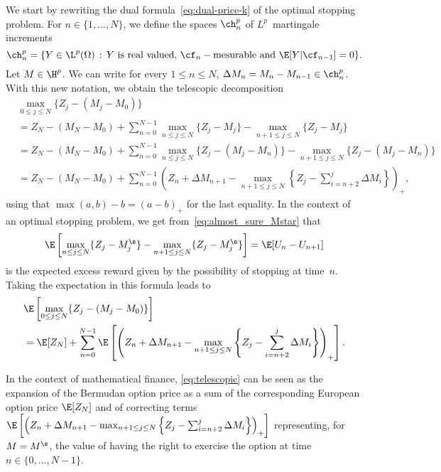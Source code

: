  
 We start by rewriting the dual formula~\eqref{eq:dual-price-k} of the optimal stopping problem. 
For $n \in \{1,\dots,N\}$, we define the spaces $\ch^p_n$ of $L^p$~martingale increments
\[
  \ch^p_n = \{ Y \in \L^p(\Omega) \,:\, Y \text{ is real valued, }\cf_{n}-\text{mesurable and } \E[Y | \cf_{n-1}] = 0\}.
\]
Let $M \in \H^p$. We can write  for every $1 \le n \le N$, $\Delta M_n=M_{n}-M_{n-1} \in \ch^p_n$. With this new notation, we obtain the telescopic decomposition
\begin{align*}
  &  \max_{0 \le j \le N} \{Z_{j} - (M_{j} -M_0)\}  \\
  & = Z_N-(M_N-M_0) + \sum_{n=0}^{N-1} \max_{n \le j \le N} \{Z_{j} - M_{j}\}  -  \max_{n + 1\le j \le N} \{Z_{j} - M_{j}\}\\
  & = Z_N-(M_N-M_0) + \sum_{n=0}^{N-1} \max_{n \le j \le N} \{Z_{j} - (M_{j}-M_{n})\}  -  \max_{n + 1\le j \le N} \{Z_{j} - (M_{j}-M_{n})\}\\
  & = Z_N-(M_N-M_0) + \sum_{n=0}^{N-1}  \left(Z_{n} + \Delta M_{n+1} - \max_{n + 1\le j \le N} \left\{Z_{j} - \sum_{i=n+2}^{j} \Delta M_i\right\} \right)_+,
\end{align*}
using that $\max(a,b)-b=(a-b)_+$ for the last equality.
In the context of an optimal stopping problem, we get from~\eqref{eq:almost_sure_Mstar} that $$\E\left[\max_{n \le j \le N} \{Z_{j} - M^\s_{j}\}  -  \max_{n + 1\le j \le N} \{Z_{j} - M^\s_{j}\}\right]=\E[U_{n}-U_{n+1}]$$ is the expected excess reward given by the possibility of stopping at time~$n$. Taking the expectation in this formula leads to
\begin{align}
  & \E\left[ \max_{0 \le j \le N} \{Z_{j} - (M_{j}-M_0)\}\right] \notag \\
  & = \E[Z_N] + \sum_{n=0}^{N-1} \E\left[ \left(Z_{n} + \Delta M_{n+1} - \max_{n + 1\le j \le N} \left\{Z_{j} - \sum_{i=n+2}^{j} \Delta M_i\right\} \right)_+\right]. \label{eq:telescopic}
\end{align}
\begin{remark}
  In the context of mathematical finance, \eqref{eq:telescopic} can be seen as the expansion of the Bermudan option price as a sum of the corresponding European option price $\E[Z_N]$ and of correcting terms $\E\left[ \left(Z_{n} + \Delta M_{n+1} - \max_{n + 1\le j \le N} \left\{Z_{j} - \sum_{i=n+2}^{j} \Delta M_i\right\} \right)_+\right]$ representing, for $M=M^\s$, the value of having the right to exercise the option at time~$n\in \{0,\dots,N-1\}$.
\end{remark}


